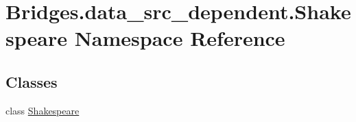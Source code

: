 \hypertarget{namespace_bridges_1_1data__src__dependent_1_1_shakespeare}{}\section{Bridges.\+data\+\_\+src\+\_\+dependent.\+Shakespeare Namespace Reference}
\label{namespace_bridges_1_1data__src__dependent_1_1_shakespeare}
\subsection*{Classes}
\begin{DoxyCompactItemize}
\item 
class \hyperlink{class_bridges_1_1data__src__dependent_1_1_shakespeare_1_1_shakespeare}{Shakespeare}
\end{DoxyCompactItemize}
